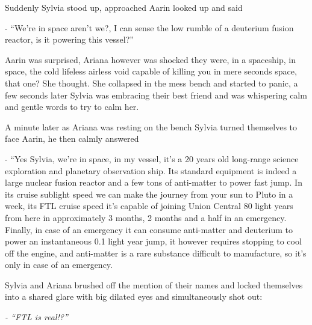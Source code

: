 \documentclass[hidelinks,12pt,a4paper]{book}
\begin{document}
Suddenly Sylvia stood up, approached Aarin looked up and said \par
\bigskip
- “We're in space aren't we?, I can sense the low rumble of a deuterium fusion reactor, is it powering this vessel?” \par
\bigskip

Aarin was surprised, Ariana however was shocked they were, in a spaceship, in space, the cold lifeless airless void 
capable of killing you in mere seconds space, that one? She thought. She collapsed in the mess bench and started to panic, 
a few seconds later Sylvia was embracing their best friend and was whispering calm and gentle words to try to calm her.\par
\bigskip

A minute later as Ariana was resting on the bench Sylvia turned themselves to face Aarin, he then calmly answered\par
\bigskip

- “Yes Sylvia, we're in space, in my vessel, it's a 20 years old long-range science exploration 
and planetary observation ship. Its standard equipment is indeed a large nuclear fusion reactor and a 
few tons of anti-matter to power fast jump. In its cruise sublight speed we can make the journey from your sun 
to Pluto in a week, its FTL cruise speed it's capable of joining Union Central 80 light years from here 
in approximately 3 months, 2 months and a half in an emergency. Finally, in case of an emergency it can consume 
anti-matter and deuterium to power an instantaneous 0.1 light year jump, it however requires stopping to cool 
off the engine, and anti-matter is a rare substance difficult to manufacture, so it's only in case of an emergency.\par
\bigskip

Sylvia and Ariana brushed off the mention of their names and locked themselves into a shared glare with big 
dilated eyes and simultaneously shot out:\par
\bigskip

\textit{- “FTL is real!?”}\par
\bigskip
\end{document}
